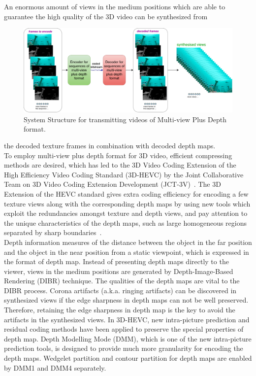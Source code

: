 An enormous amount of views in the medium positions which are able to
guarantee the high quality of the 3D video can be synthesized from
\begin{figure}
    \centering
    \includegraphics[width=\textwidth,height=\textheight,keepaspectratio]{Figures/SystemStructureOf3DEncoder}
    \caption[System Structure for transmitting videos of Multi-view Plus Depth format]{System Structure for transmitting videos of Multi-view Plus Depth format.}
    \label{fig:SS-MVD}
\end{figure}
the decoded texture frames in combination with decoded depth maps.\\
\newline
To employ multi-view plus depth format for 3D video, efficient compressing
methods are desired, which has led to the 3D Video Coding Extension of the
High Efficiency Video Coding Standard (3D-HEVC) by the Joint Collaborative Team
on 3D Video Coding Extension Development (JCT-3V)~\parencite{RN195}.
The 3D Extension of the HEVC standard gives extra coding efficiency
for encoding a few texture views along with the corresponding depth maps by
using new tools which exploit the redundancies amongst
texture and depth views, and pay attention to the unique characteristics of
the depth maps, such as large homogeneous
regions separated by sharp boundaries~\parencite{RN47}.\\
\newline
Depth information measures of the distance between the object in the far position
and the object in the near position from a static viewpoint,
which is expressed in the format of depth map.
Instead of presenting depth maps directly to the viewer, views in the medium
positions are generated by Depth-Image-Based Rendering (DIBR) technique.
The qualities of the depth maps are vital to the DIBR process.
Corona artifacts (a.k.a. ringing artifacts) can be discovered in synthesized
views if the edge sharpness in depth maps can not be well
preserved.
Therefore, retaining the edge sharpness in depth map is the key to avoid the
artifacts in the synthesized views.
In 3D-HEVC, new intra-picture prediction and residual coding methods
have been applied to preserve the special properties of depth
map.
Depth Modelling Mode (DMM), which is one of the new intra-picture
prediction tools, is designed to provide much more granularity for
encoding the depth maps.
Wedgelet partition and contour partition for depth maps
are enabled by DMM1 and DMM4 separately.

